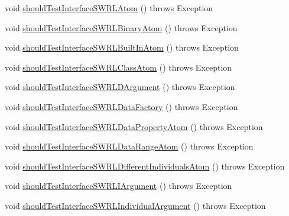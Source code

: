 \begin{DoxyCompactItemize}
\item 
void \hyperlink{classorg_1_1semanticweb_1_1owlapi_1_1contract_1_1_contract_owlapi_model__4_test_a1c78ad45a26f51de41b4ed083922bad2}{should\-Test\-Interface\-S\-W\-R\-L\-Atom} ()  throws Exception 
\item 
void \hyperlink{classorg_1_1semanticweb_1_1owlapi_1_1contract_1_1_contract_owlapi_model__4_test_a8755b665807b4c3d9214c69fcc504d6c}{should\-Test\-Interface\-S\-W\-R\-L\-Binary\-Atom} ()  throws Exception 
\item 
void \hyperlink{classorg_1_1semanticweb_1_1owlapi_1_1contract_1_1_contract_owlapi_model__4_test_a5907c98fb2b30e2d05e4fe46171747b9}{should\-Test\-Interface\-S\-W\-R\-L\-Built\-In\-Atom} ()  throws Exception 
\item 
void \hyperlink{classorg_1_1semanticweb_1_1owlapi_1_1contract_1_1_contract_owlapi_model__4_test_a035775453c655c6e5beb0e261b2446c4}{should\-Test\-Interface\-S\-W\-R\-L\-Class\-Atom} ()  throws Exception 
\item 
void \hyperlink{classorg_1_1semanticweb_1_1owlapi_1_1contract_1_1_contract_owlapi_model__4_test_ad0c3d4c229e07c6af07a28d8977cf4ec}{should\-Test\-Interface\-S\-W\-R\-L\-D\-Argument} ()  throws Exception 
\item 
void \hyperlink{classorg_1_1semanticweb_1_1owlapi_1_1contract_1_1_contract_owlapi_model__4_test_a006f9219c56bd3f6d697a6a176279efe}{should\-Test\-Interface\-S\-W\-R\-L\-Data\-Factory} ()  throws Exception 
\item 
void \hyperlink{classorg_1_1semanticweb_1_1owlapi_1_1contract_1_1_contract_owlapi_model__4_test_a7049297897afc99bd3a9bb4120d0efac}{should\-Test\-Interface\-S\-W\-R\-L\-Data\-Property\-Atom} ()  throws Exception 
\item 
void \hyperlink{classorg_1_1semanticweb_1_1owlapi_1_1contract_1_1_contract_owlapi_model__4_test_a0ae2496d90d30ba0e2064738fd781b71}{should\-Test\-Interface\-S\-W\-R\-L\-Data\-Range\-Atom} ()  throws Exception 
\item 
void \hyperlink{classorg_1_1semanticweb_1_1owlapi_1_1contract_1_1_contract_owlapi_model__4_test_a4febfee6031a856cd6a413e745695d02}{should\-Test\-Interface\-S\-W\-R\-L\-Different\-Individuals\-Atom} ()  throws Exception 
\item 
void \hyperlink{classorg_1_1semanticweb_1_1owlapi_1_1contract_1_1_contract_owlapi_model__4_test_a0a3ce875c900da11d93d755a90a04f98}{should\-Test\-Interface\-S\-W\-R\-L\-I\-Argument} ()  throws Exception 
\item 
void \hyperlink{classorg_1_1semanticweb_1_1owlapi_1_1contract_1_1_contract_owlapi_model__4_test_ab62fcfc68ec8127a44672519a94a2386}{should\-Test\-Interface\-S\-W\-R\-L\-Individual\-Argument} ()  throws Exception 

\end{DoxyCompactItemize}

